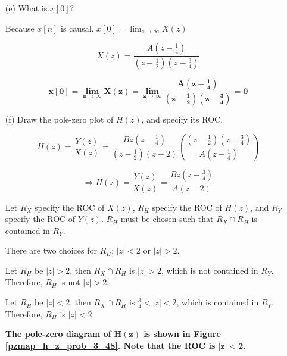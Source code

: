 \documentclass[fleqn]{article}
\begin{document}
\begin{enumerate}[nolistsep]
\begin{enumerate} [nolistsep]
						\textbf{Because $\mathbf{X(z)}$ does not have a pole at $\mathbf{z = \infty}$, $\mathbf{x[n]}$ must be causal.}
						
					\item[(e)] What is $x[0]$?
					
						Because $x[n]$ is causal. $x[0] = \displaystyle\lim_{z\to\infty}{X(z)}$
						
						\begin{equation*}
							X(z) = \frac{A\left(z - \frac{1}{4}\right)}{\left(z - \frac{1}{2}\right)\left(z - \frac{3}{4}\right)}
						\end{equation*}
						
						\begin{equation*}
							\mathbf{x[0] = \displaystyle\lim_{n\to\infty}{X(z)} = \displaystyle\lim_{z\to\infty}{\frac{A\left(z - \frac{1}{4}\right)}{\left(z - \frac{1}{2}\right)\left(z - \frac{3}{4}\right)}} = 0}
						\end{equation*}
							
					\item[(f)] Draw the pole-zero plot of $H(z)$, and specify its ROC.
					
					\begin{equation*}
						H(z) = \frac{Y(z)}{X(z)} = \frac{Bz\left(z - \frac{1}{4}\right)}{\left(z - \frac{1}{2}\right)\left(z - 2\right)}\left(\frac{\left(z - \frac{1}{2}\right)\left(z - \frac{3}{4}\right)}{A\left(z - \frac{1}{4}\right)}\right)
					\end{equation*}
					
					\begin{equation*}
						\Rightarrow H(z) = \frac{Y(z)}{X(z)} = \frac{Bz\left(z - \frac{3}{4}\right)}{A\left(z - 2\right)}
					\end{equation*}
					
					Let $R_X$ specify the ROC of $X(z)$, $R_H$ specify the ROC of $H(z)$, and $R_Y$ specify the ROC of $Y(z)$. $R_H$ must be chosen such that $R_X \cap R_H$ is contained in $R_Y$. 
					
					There are two choices for $R_H$: $|z| < 2$ or $|z| > 2$.
					
					Let $R_H$ be $|z| > 2$, then $R_X \cap R_H$ is $|z| > 2$, which is not contained in $R_Y$. Therefore, $R_H$ is not $|z| > 2$.
					
					Let $R_H$ be $|z| < 2$, then $R_X \cap R_H$ is $\frac{3}{4} < |z| < 2$, which is contained in $R_Y$. Therefore, $R_H$ is $|z| < 2$.
					
					\textbf{The pole-zero diagram of $\mathbf{H(z)}$ is shown in Figure \ref{pzmap_h_z_prob_3_48}. Note that the ROC is $\mathbf{|z| < 2}$.}
					

\end{enumerate}
\end{enumerate}
\end{document}
